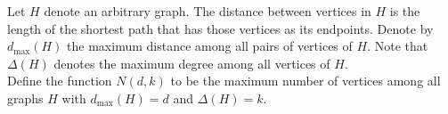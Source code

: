 \documentclass[answers]{exam}
\begin{document}
	\begin{questions}
		\question 
		
		
		
		\noindent Let $H$ denote an arbitrary graph. The distance between vertices in $H$ is the length of the shortest path that has those vertices as its endpoints.  Denote by $d_{\mathrm{max}}(H)$ the maximum distance among all pairs of vertices of $H$.
		Note that $\Delta(H)$ denotes the maximum degree among all vertices of $H$.\\
		
		
		\noindent Define the function $N(d,k)$ to be the maximum number of vertices among all graphs $H$ with $d_{\mathrm{max}}(H) = d$ and $\Delta(H) = k$.\\
		
		\begin{minipage}{.5\linewidth}
			

\end{minipage}
\end{questions}
\end{document}

